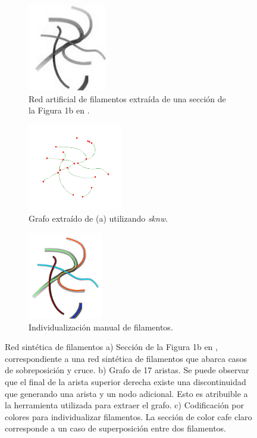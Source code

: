  \begin{figure}[h!]
    \centering
    \begin{subfigure}[t]{0.3\textwidth}
        \centering
        \includegraphics[height=1.5in]{benchImages/define-weighted-4.png}
        \caption{Red artificial de filamentos extra\'ida de una secci\'on de la Figura 1b en \citet{breuer2015define}.}
        \label{fig:synth-Define-1b-original}
    \end{subfigure}%
    \hspace{0.5cm}
    \begin{subfigure}[t]{0.3\textwidth}
        \centering
        \includegraphics[height=1.5in]{benchImages/define-weighted-4_inv_graph_labeled_thick.png}
        \caption{Grafo extra\'ido de (a) utilizando {\it sknw}.}
        \label{fig:synth-Define-1b-graph}
    \end{subfigure}
    \hspace{0.5cm}
    \begin{subfigure}[t]{0.3\textwidth}
        \centering
        \includegraphics[height=1.5in]{benchImages/define-weighted-4-groundTruth.png}
        \caption{Individualizaci\'on manual de filamentos.}
        \label{fig:synth-Define-1b-graph-gt}
    \end{subfigure}
    \caption[Red de filamentos sint\'eticos a evaluar con el algoritmo propuesto.]{Red sint\'etica de filamentos a) Secci\'on de la Figura 1b en \citet{breuer2015define}, correspondiente a una red sint\'etica de filamentos que abarca casos de sobreposici\'on y cruce. b) Grafo de 17 aristas. Se puede observar que el final de la arista superior derecha existe una discontinuidad que generando una arista y un nodo adicional. Esto es atribuible a la herramienta utilizada para extraer el grafo. c) Codificaci\'on por colores para individualizar filamentos. La secci\'on de color cafe claro corresponde a un caso de superposici\'on entre dos filamentos.}
    \label{fig:synth-Define-1b}
\end{figure}

